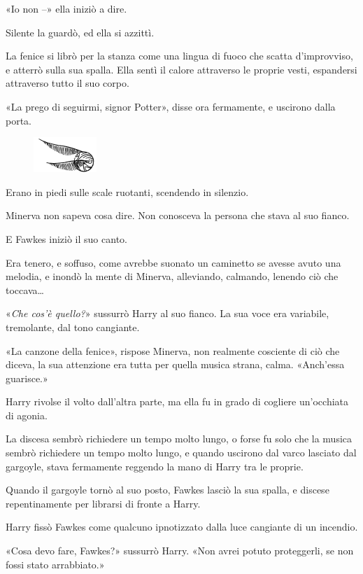 «Io non –» ella iniziò a dire.

Silente la guardò, ed ella si azzittì.

La fenice si librò per la stanza come una lingua di fuoco che scatta d’improvviso, e atterrò sulla sua spalla. Ella sentì il calore attraverso le proprie vesti, espandersi attraverso tutto il suo corpo.

«La prego di seguirmi, signor Potter», disse ora fermamente, e uscirono dalla porta.

\begin{figure}[h!]
        \includegraphics[scale=0.4]{boccino.png}
        \centering
\end{figure}

Erano in piedi sulle scale ruotanti, scendendo in silenzio.

Minerva non sapeva cosa dire. Non conosceva la persona che stava al suo fianco.

E Fawkes iniziò il suo canto.

Era tenero, e soffuso, come avrebbe suonato un caminetto se avesse avuto una melodia, e inondò la mente di Minerva, alleviando, calmando, lenendo ciò che toccava…

«\textit{Che cos’è quello?}» sussurrò Harry al suo fianco. La sua voce era variabile, tremolante, dal tono cangiante.

«La canzone della fenice», rispose Minerva, non realmente cosciente di ciò che diceva, la sua attenzione era tutta per quella musica strana, calma. «Anch’essa guarisce.»

Harry rivolse il volto dall’altra parte, ma ella fu in grado di cogliere un’occhiata di agonia.

La discesa sembrò richiedere un tempo molto lungo, o forse fu solo che la musica sembrò richiedere un tempo molto lungo, e quando uscirono dal varco lasciato dal gargoyle, stava fermamente reggendo la mano di Harry tra le proprie.

Quando il gargoyle tornò al suo posto, Fawkes lasciò la sua spalla, e discese repentinamente per librarsi di fronte a Harry.

Harry fissò Fawkes come qualcuno ipnotizzato dalla luce cangiante di un incendio.

«Cosa devo fare, Fawkes?» sussurrò Harry. «Non avrei potuto proteggerli, se non fossi stato arrabbiato.»

